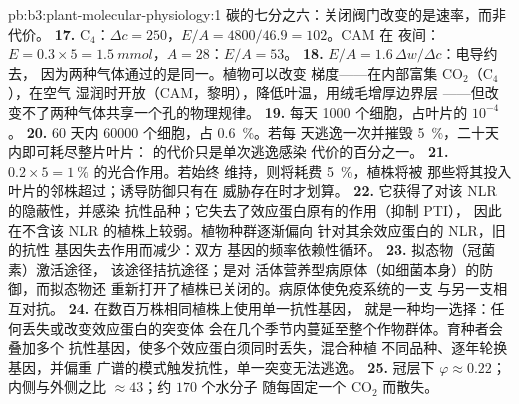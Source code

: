 \begin{solution}{pb:b3:plant-molecular-physiology:1}
碳的七分之六：关闭阀门改变的是速率，而非代价。
\textbf{17.} C$_{4}$：$\Delta c = 250$，$E/A = 4800/46.9 = 102$。CAM 在
夜间：$E = 0.3\times 5 = \qty{1.5}{mmol}$，$A = 28$：$E/A = 53$。
\textbf{18.} $E/A = 1.6\,\Delta w/\Delta c$：电导约去，
因为两种气体通过的是同一。植物可以改变
梯度——在内部富集 CO$_{2}$（C$_{4}$），在空气
湿润时开放（CAM，黎明），降低叶温，用绒毛增厚边界层
——但改变不了两种气体共享一个孔的物理规律。
\textbf{19.} 每天 \num{1000} 个细胞，占叶片的 $10^{-4}$。
\textbf{20.} 60 天内 \num{60000} 个细胞，占 \qty{0.6}{\%}。若每
天逃逸一次并摧毁 \qty{5}{\%}，二十天内即可耗尽整片叶片：
的代价只是单次逃逸感染
代价的百分之一。
\textbf{21.} $0.2\times 5 = \qty{1}{\%}$ 的光合作用。若始终
维持，则将耗费 \qty{5}{\%}，植株将被
那些将其投入叶片的邻株超过；诱导防御只有在
威胁存在时才划算。
\textbf{22.} 它获得了对该 NLR 的隐蔽性，并感染
抗性品种；它失去了效应蛋白原有的作用（抑制 PTI），
因此在不含该 NLR 的植株上较弱。植物种群逐渐偏向
针对其余效应蛋白的 NLR，旧的抗性
基因失去作用而减少：双方
基因的频率依赖性循环。
\textbf{23.} 拟态物（冠菌素）激活途径，
该途径拮抗途径；是对
活体营养型病原体（如细菌本身）的防御，而拟态物还
重新打开了植株已关闭的。病原体使免疫系统的一支
与另一支相互对抗。
\textbf{24.} 在数百万株相同植株上使用单一抗性基因，
就是一种均一选择：任何丢失或改变效应蛋白的突变体
会在几个季节内蔓延至整个作物群体。育种者会叠加多个
抗性基因，使多个效应蛋白须同时丢失，混合种植
不同品种、逐年轮换基因，并偏重
广谱的模式触发抗性，单一突变无法逃逸。
\textbf{25.} 冠层下 $\varphi \approx 0.22$；
内侧与外侧之比 $\approx 43$；约 $170$ 个水分子
随每固定一个 CO$_{2}$ 而散失。
\end{solution}
